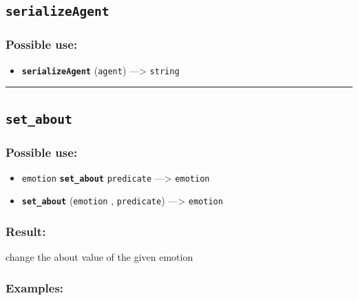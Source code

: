 \documentclass[]{book}
\providecommand{\tightlist}{%
  \setlength{\itemsep}{0pt}\setlength{\parskip}{0pt}}
\theoremstyle{definition}
\theoremstyle{definition}
\theoremstyle{definition}
\theoremstyle{remark}
\begin{document}
\subsection{\texorpdfstring{\texttt{serializeAgent}}{serializeAgent}}\label{serializeagent}

\subsubsection{Possible use:}\label{possible-use-453}

\begin{itemize}
\tightlist
\item
  \textbf{\texttt{serializeAgent}} (\texttt{agent}) ---\textgreater{}
  \texttt{string}
\end{itemize}

\begin{center}\rule{0.5\linewidth}{\linethickness}\end{center}

\subsection{\texorpdfstring{\texttt{set\_about}}{set\_about}}\label{set_about}

\subsubsection{Possible use:}\label{possible-use-454}

\begin{itemize}
\tightlist
\item
  \texttt{emotion} \textbf{\texttt{set\_about}} \texttt{predicate}
  ---\textgreater{} \texttt{emotion}
\item
  \textbf{\texttt{set\_about}} (\texttt{emotion} , \texttt{predicate})
  ---\textgreater{} \texttt{emotion}
\end{itemize}

\subsubsection{Result:}\label{result-438}

change the about value of the given emotion

\subsubsection{Examples:}\label{examples-311}
\end{document}
